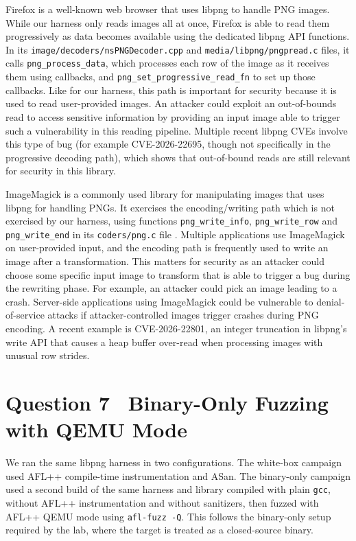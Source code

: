 \documentclass[letterpaper,twocolumn,10pt]{article}
\begin{document}
Firefox is a well-known web browser that uses libpng to handle PNG images. While our harness only reads images all at once, Firefox is able to read them progressively as data becomes available using the dedicated libpng API functions. In its \texttt{image/decoders/nsPNGDecoder.cpp} \cite{ffcode} and \texttt{media/libpng/pngpread.c} \cite{ffcode2} files, it calls \texttt{png\_process\_data}, which processes each row of the image as it receives them using callbacks, and \texttt{png\_set\_progressive\_read\_fn} to set up those callbacks. Like for our harness, this path is important for security because it is used to read user-provided images. 
An attacker could exploit an out-of-bounds read to access sensitive information by providing an input image able to trigger such a vulnerability in this reading pipeline. Multiple recent libpng CVEs involve this type of bug (for example CVE-2026-22695, though not specifically in the progressive decoding path), which shows that out-of-bound reads are still relevant for security in this library.

ImageMagick \cite{imagemagick} is a commonly used library for manipulating images that uses libpng for handling PNGs. It exercises the encoding/writing path which is not exercised by our harness, using functions \texttt{png\_write\_info}, \texttt{png\_write\_row} and \texttt{png\_write\_end} in its \texttt{coders/png.c} file \cite{imcode}. Multiple applications use ImageMagick on user-provided input, and the encoding path is frequently used to write an image after a transformation. This matters for security as an attacker could choose some specific input image to transform that is able to trigger a bug during the rewriting phase. For example, an attacker could pick an image leading to a crash. Server-side applications using ImageMagick could be vulnerable to denial-of-service attacks if attacker-controlled images trigger crashes during PNG encoding. A recent example is CVE-2026-22801, an integer truncation in libpng's write API that causes a heap buffer over-read when processing images with unusual row strides.

\section{Question 7 \textendash\ Binary-Only Fuzzing with QEMU Mode}

We ran the same libpng harness in two configurations. The white-box campaign
used AFL++ compile-time instrumentation and ASan. The binary-only campaign used
a second build of the same harness and library compiled with plain
\texttt{gcc}, without AFL++ instrumentation and without sanitizers, then fuzzed
with AFL++ QEMU mode using \texttt{afl-fuzz -Q}. This follows the binary-only
setup required by the lab, where the target is treated as a closed-source
binary.
\end{document}
